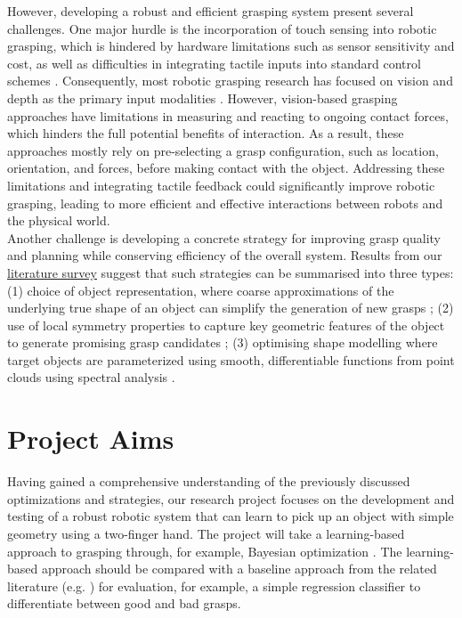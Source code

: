 \documentclass[12pt, a4paper]{report}
\theoremstyle{definition}
\begin{document}
However, developing a robust and efficient grasping system present several challenges. One major hurdle is the incorporation of touch sensing into robotic grasping, which is hindered by hardware limitations such as sensor sensitivity and cost, as well as difficulties in integrating tactile inputs into standard control schemes \cite{calandra}. Consequently, most robotic grasping research has focused on vision and depth as the primary input modalities \cite{calandra}. However, vision-based grasping approaches have limitations in measuring and reacting to ongoing contact forces, which hinders the full potential benefits of interaction. As a result, these approaches mostly rely on pre-selecting a grasp configuration, such as location, orientation, and forces, before making contact with the object. Addressing these limitations and integrating tactile feedback could significantly improve robotic grasping, leading to more efficient and effective interactions between robots and the physical world.\\

Another challenge is developing a concrete strategy for improving grasp quality and planning while conserving efficiency of the overall system. Results from our \hyperref[chap:2]{literature survey} suggest that such strategies can be summarised into three types: (1) choice of object representation, where coarse approximations of the underlying true shape of an object can simplify the generation of new grasps \cite{farias} \cite{geidenstam}; (2) use of local symmetry properties to capture key geometric features of the object to generate promising grasp candidates \cite{farias} \cite{przybylski}; (3) optimising shape modelling where target objects are parameterized using smooth, differentiable functions from point clouds using spectral analysis \cite{farias}.


\section{Project Aims}
\label{sec:1.2}
Having gained a comprehensive understanding of the previously discussed optimizations and strategies, our research project focuses on the development and testing of a robust robotic system that can learn to pick up an object with simple geometry using a two-finger hand. The project will take a learning-based approach to grasping through, for example, Bayesian optimization \cite{nogueria, frazier}. The learning-based approach should be compared with a baseline approach from the related literature (e.g. \cite{nogueria, danielczuk, breyer}) for evaluation, for example, a simple regression classifier to differentiate between good and bad grasps.
\end{document}
